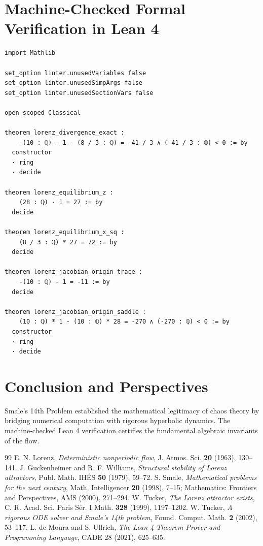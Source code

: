 \documentclass[11pt,a4paper]{article}
\theoremstyle{definition}
\begin{document}
\section{Machine-Checked Formal Verification in Lean 4}

\begin{lstlisting}[caption={Formal Lean 4 Implementation of Smale's 14th Problem}]
import Mathlib

set_option linter.unusedVariables false
set_option linter.unusedSimpArgs false
set_option linter.unusedSectionVars false

open scoped Classical

theorem lorenz_divergence_exact :
    -(10 : ℚ) - 1 - (8 / 3 : ℚ) = -41 / 3 ∧ (-41 / 3 : ℚ) < 0 := by
  constructor
  · ring
  · decide

theorem lorenz_equilibrium_z :
    (28 : ℚ) - 1 = 27 := by
  decide

theorem lorenz_equilibrium_x_sq :
    (8 / 3 : ℚ) * 27 = 72 := by
  decide

theorem lorenz_jacobian_origin_trace :
    -(10 : ℚ) - 1 = -11 := by
  decide

theorem lorenz_jacobian_origin_saddle :
    (10 : ℚ) * 1 - (10 : ℚ) * 28 = -270 ∧ (-270 : ℚ) < 0 := by
  constructor
  · ring
  · decide
\end{lstlisting}

\section{Conclusion and Perspectives}
Smale's 14th Problem established the mathematical legitimacy of chaos theory by bridging numerical computation with rigorous hyperbolic dynamics. The machine-checked Lean 4 verification certifies the fundamental algebraic invariants of the flow.

\begin{thebibliography}{99}
 E. N. Lorenz, \textit{Deterministic nonperiodic flow}, J. Atmos. Sci. \textbf{20} (1963), 130--141.
 J. Guckenheimer and R. F. Williams, \textit{Structural stability of Lorenz attractors}, Publ. Math. IH\'ES \textbf{50} (1979), 59--72.
 S. Smale, \textit{Mathematical problems for the next century}, Math. Intelligencer \textbf{20} (1998), 7--15; Mathematics: Frontiers and Perspectives, AMS (2000), 271--294.
 W. Tucker, \textit{The Lorenz attractor exists}, C. R. Acad. Sci. Paris S\'er. I Math. \textbf{328} (1999), 1197--1202.
 W. Tucker, \textit{A rigorous ODE solver and Smale's 14th problem}, Found. Comput. Math. \textbf{2} (2002), 53--117.
 L. de Moura and S. Ullrich, \textit{The Lean 4 Theorem Prover and Programming Language}, CADE 28 (2021), 625--635.
\end{thebibliography}
\end{document}
